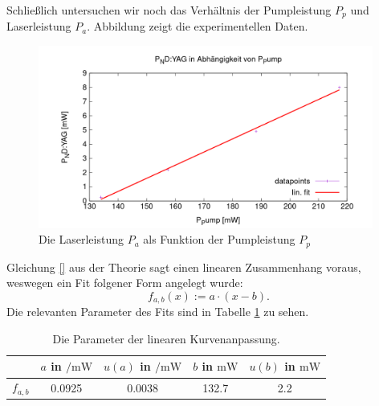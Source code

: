 \documentclass[../../../main.tex]{subfiles}
\begin{document}
    Schließlich untersuchen wir noch das Verhältnis der Pumpleistung $P_p$ und Laserleistung $P_a$. Abbildung zeigt die experimentellen Daten.

    \begin{figure}[H]
        \centering
        \includegraphics[width=11cm]{../../Bilddateien/5/P(NDYAG)overP(Pump).png}
        \caption{Die Laserleistung $P_a$ als Funktion der Pumpleistung $P_p$}
        \label{fig:PumpLaserLeistung}
    \end{figure}

    Gleichung \eqref{} aus der Theorie sagt einen linearen Zusammenhang voraus, weswegen ein Fit folgener Form angelegt wurde:
    \[
        f_{a,b}(x) := a\cdot (x - b).      
    \]
    Die relevanten Parameter des Fits sind in Tabelle \ref{tab:PumpLaserLeistungFitParameter} zu sehen.

    \begin{table}[H]
        \centering
        \begin{tabular}{c|cc |cc}
            \hline
            & $a$ in $\si{\per\milli\W}$ & $u(a)$ in $\si{\per\milli\W}$ & $b$ in $\si{\milli\W}$ & $u(b)$ in $\si{\milli\W}$\\
            \hline\hline
            $f_{a, b}$ & 0.0925 & 0.0038 & 132.7 & 2.2
        \end{tabular}
        \caption{Die Parameter der linearen Kurvenanpassung.}
        \label{tab:PumpLaserLeistungFitParameter}
    \end{table}
\end{document}
